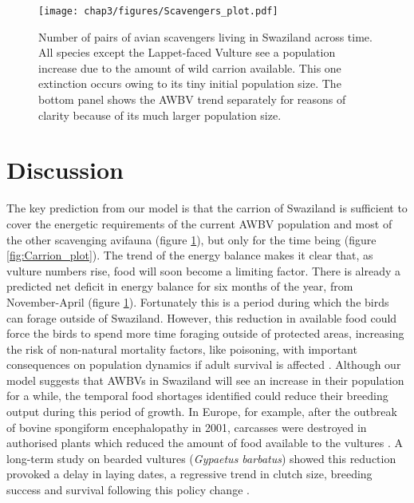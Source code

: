 \begin{figure}[H] %
	  \centering
	  \texttt{[image: chap3/figures/Scavengers\_plot.pdf]}
	    \caption[Avian scavenging guild population dynamics in Swaziland] %
	    {Number of pairs of avian scavengers living in Swaziland across time. All species except the Lappet-faced Vulture see a population increase due to the amount of wild carrion available. This one extinction occurs owing to its tiny initial population size. The bottom panel shows the AWBV trend separately for reasons of clarity because of its much larger population size. }%
	  \label{fig:Scavengers_plot}
	\end{figure}
	


\section{\uppercase{D}iscussion}

The key prediction from our model is that the carrion of Swaziland is sufficient to cover the energetic requirements of the current AWBV population and most of the other scavenging avifauna (figure \ref{fig:Scavengers_plot}), but only for the time being (figure \ref{fig:Carrion_plot}). The trend of the energy balance makes it clear that, as vulture numbers rise, food will soon become a limiting factor. There is already a predicted net deficit in energy balance for six months of the year, from November-April (figure \ref{fig:Scavengers_plot}). Fortunately this is a period during which the birds can forage outside of Swaziland. However, this reduction in available food could force the birds to spend more time foraging outside of protected areas, increasing the risk of non-natural mortality factors, like poisoning, with important consequences on population dynamics if adult survival is affected \citep{monadjem2014effect}. Although our model suggests that AWBVs in Swaziland will see an increase in their population for a while, the temporal food shortages identified could reduce their breeding output during this period of growth. In Europe, for example, after the outbreak of bovine spongiform encephalopathy in 2001, carcasses were destroyed in authorised plants which reduced the amount of food available to the vultures \citep{margalida2010sanitary}. A long-term study on bearded vultures (\textit{Gypaetus barbatus}) showed this reduction provoked a delay in laying dates, a regressive trend in clutch size, breeding success and survival following this policy change \citep{margalida2014man}. 


